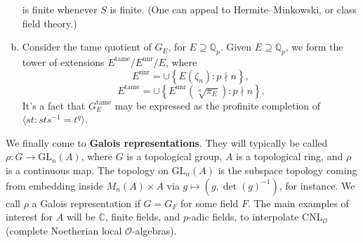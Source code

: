 \documentclass[reqno]{amsart} 
\begin{document}
\begin{example}
\begin{enumerate}[(a)]
    is finite whenever $S$ is finite.  (One can appeal to Hermite--Minkowski, or class field theory.)
  \item\label{enumerate:cq6r3g5bmp} Consider the tame quotient of $G_E$, for $E \supseteq \mathbb{Q}_p$.  Given $E \supseteq \mathbb{Q}_p$, we form the tower of extensions $E^{\mathrm{tame}} / E^{\mathrm{unr}} / E$, where
    \begin{equation*}
      E^{\mathrm{unr}} = \cup \left\{ E(\zeta_n) : p \nmid n \right\},
    \end{equation*}
    \begin{equation*}
      E^{\mathrm{tame}} = \cup \left\{ E^{\mathrm{unr}}(\sqrt[n]{\pi_E}) : p \nmid n \right\}.
    \end{equation*}
    It's a fact that $G_E^{\mathrm{tame}}$ may be expressed as the profinite completion of $\langle s t : s t s^{-1} = t^q \rangle$.
  \end{enumerate}
\end{example}
We finally come to \textbf{Galois representations}.  They will typically be called $\rho : G \rightarrow \mathrm{GL}_n(A)$, where $G$ is a topological group, $A$ is a topological ring, and $\rho$ is a continuous map.  The topology on $\mathrm{GL}_n(A)$ is the subspace topology coming from embedding inside $M_n(A) \times A$ via $g \mapsto(g, \det(g)^{-1})$, for instance.  We call $\rho$ a Galois representation if $G = G_F$ for some field $F$.  The main examples of interest for $A$ will be $\mathbb{C}$, finite fields, and $p$-adic fields, to interpolate $\mathrm{C N L}_{\mathcal{O}}$ (complete Noetherian local $\mathcal{O}$-algebras).
\end{document}
